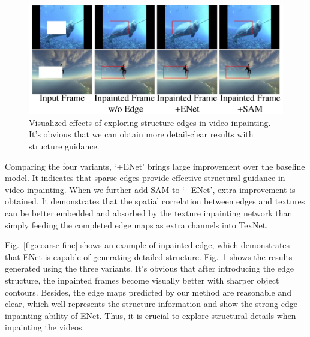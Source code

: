 \begin{figure}[!ht]
	\centering
	\includegraphics[width=0.97\columnwidth]{edgevis} %
	\caption{Visualized effects of exploring structure edges in video inpainting. It's obvious that we can obtain more detail-clear results with structure guidance.}
	\label{edgevis}
\end{figure}



Comparing the four variants, `+ENet' brings large improvement over the baseline model.
It indicates that sparse edges provide effective structural guidance in video inpainting.
When we further add SAM to `+ENet', extra improvement is obtained. 
It demonstrates that the spatial correlation between  edges and textures can be better embedded and absorbed by the texture inpainting network than simply feeding the completed edge maps as extra channels into TexNet.

Fig.~\ref{fig:coarse-fine} shows an example of inpainted edge, which demonstrates that ENet is capable of generating detailed structure.
Fig.~\ref{edgevis} shows the results generated using the three variants. 
It's obvious that after introducing the edge structure, the inpainted frames become visually better with sharper object contours. 
Besides, the edge maps predicted by our method are reasonable and clear, which well represents the structure information and show the strong edge inpainting ability of ENet. Thus, it is crucial to explore structural details when inpainting the videos.




